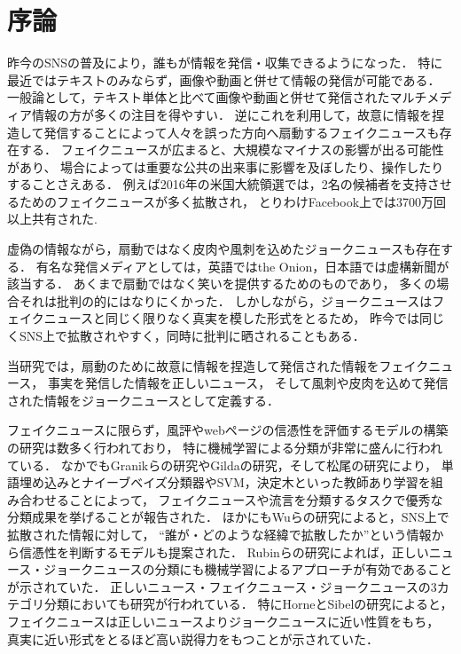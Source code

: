 \section{序論}
\label{ch:introduction}
%
昨今のSNSの普及により，誰もが情報を発信・収集できるようになった．
特に最近ではテキストのみならず，画像や動画と併せて情報の発信が可能である．
一般論として，テキスト単体と比べて画像や動画と併せて発信されたマルチメディア情報の方が多くの注目を得やすい．
逆にこれを利用して，故意に情報を捏造して発信することによって人々を誤った方向へ扇動するフェイクニュースも存在する．
フェイクニュースが広まると、大規模なマイナスの影響が出る可能性があり、
場合によっては重要な公共の出来事に影響を及ぼしたり、操作したりすることさえある．
例えば2016年の米国大統領選では，2名の候補者を支持させるためのフェイクニュースが多く拡散され，
とりわけFacebook上では3700万回以上共有された\cite{10.1257/jep.31.2.211}.

虚偽の情報ながら，扇動ではなく皮肉や風刺を込めたジョークニュースも存在する．
有名な発信メディアとしては，英語ではthe Onion，日本語では虚構新聞が該当する．
あくまで扇動ではなく笑いを提供するためのものであり，
多くの場合それは批判の的にはなりにくかった．
しかしながら，ジョークニュースはフェイクニュースと同じく限りなく真実を模した形式をとるため，
昨今では同じくSNS上で拡散されやすく，同時に批判に晒されることもある．

当研究では，扇動のために故意に情報を捏造して発信された情報をフェイクニュース，
事実を発信した情報を正しいニュース，
そして風刺や皮肉を込めて発信された情報をジョークニュースとして定義する．

フェイクニュースに限らず，風評やwebページの信憑性を評価するモデルの構築の研究は数多く行われており，
特に機械学習による分類が非常に盛んに行われている．
なかでもGranikらの研究\cite{Granik8100379}やGildaの研究\cite{Gilda8305411}，そして松尾の研究\cite{松尾省吾2018master}により，
単語埋め込みとナイーブベイズ分類器やSVM，決定木といった教師あり学習を組み合わせることによって，
フェイクニュースや流言を分類するタスクで優秀な分類成果を挙げることが報告された．
ほかにもWuらの研究\cite{Wu:2018:TFF:3159652.3159677}によると，SNS上で拡散された情報に対して，
``誰が・どのような経緯で拡散したか''という情報から信憑性を判断するモデルも提案された． 
Rubinらの研究\cite{W16-0802}によれば，正しいニュース・ジョークニュースの分類にも機械学習によるアプローチが有効であることが示されていた．
正しいニュース・フェイクニュース・ジョークニュースの3カテゴリ分類においても研究が行われている．
特にHorneとSibelの研究\cite{DBLP:journals/corr/HorneA17}によると，フェイクニュースは正しいニュースよりジョークニュースに近い性質をもち，
真実に近い形式をとるほど高い説得力をもつことが示されていた．

